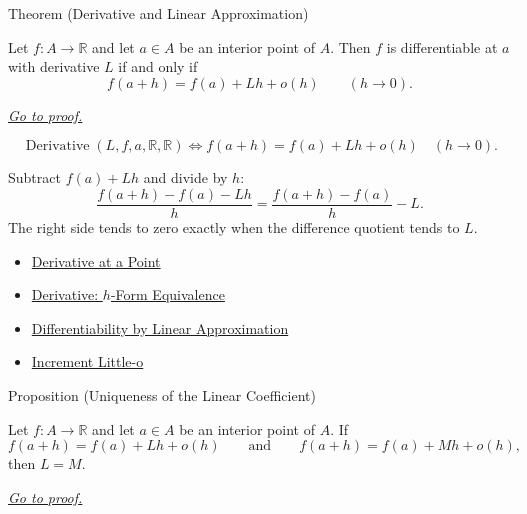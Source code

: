 \begin{theorembox}{Theorem (Derivative and Linear Approximation)}
\begin{theorem}
\label{thm:derivative-linear-approximation-equivalence}
Let $f:A\to\mathbb{R}$ and let $a\in A$ be an interior point of $A$. Then
$f$ is differentiable at $a$ with derivative $L$ if and only if
\[
  f(a+h)=f(a)+Lh+o(h)
  \qquad (h\to 0).
\]

\smallskip\noindent
\hyperref[prf:derivative-linear-approximation-equivalence]{\textit{Go to proof.}}
\end{theorem}
\end{theorembox}

\begin{remark*}
\[
\operatorname{Derivative}(L,f,a,\mathbb{R},\mathbb{R})
\Longleftrightarrow
f(a+h)=f(a)+Lh+o(h)\quad(h\to 0).
\]
\end{remark*}

\begin{remark*}[Interpretation]
Subtract $f(a)+Lh$ and divide by $h$:
\[
  \frac{f(a+h)-f(a)-Lh}{h}
  =
  \frac{f(a+h)-f(a)}{h}-L.
\]
The right side tends to zero exactly when the difference quotient tends to
$L$.
\end{remark*}

\begin{dependencies}
\begin{itemize}
  \item \hyperref[def:derivative-at-a-point]{Derivative at a Point}
  \item \hyperref[prop:derivative-h-form-equivalence]{Derivative: $h$-Form Equivalence}
  \item \hyperref[def:differentiability-linear-approximation]{Differentiability by Linear Approximation}
  \item \hyperref[def:increment-little-o]{Increment Little-o}
\end{itemize}
\end{dependencies}

\begin{propositionbox}{Proposition (Uniqueness of the Linear Coefficient)}
\begin{proposition}
\label{prop:linear-approximation-unique}
Let $f:A\to\mathbb{R}$ and let $a\in A$ be an interior point of $A$. If
\[
  f(a+h)=f(a)+Lh+o(h)
  \qquad\text{and}\qquad
  f(a+h)=f(a)+Mh+o(h),
\]
then $L=M$.

\smallskip\noindent
\hyperref[prf:linear-approximation-unique]{\textit{Go to proof.}}
\end{proposition}
\end{propositionbox}

